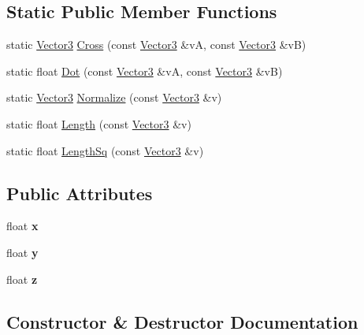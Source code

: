 \subsection*{Static Public Member Functions}
\begin{DoxyCompactItemize}
\item 
static \hyperlink{class_vector3}{Vector3} \hyperlink{class_vector3_a9f00ed675f4ba9628c82215fa23ab885}{Cross} (const \hyperlink{class_vector3}{Vector3} \&v\+A, const \hyperlink{class_vector3}{Vector3} \&v\+B)
\item 
static float \hyperlink{class_vector3_ae785bd82122c8762428f2fad2cb56322}{Dot} (const \hyperlink{class_vector3}{Vector3} \&v\+A, const \hyperlink{class_vector3}{Vector3} \&v\+B)
\item 
static \hyperlink{class_vector3}{Vector3} \hyperlink{class_vector3_a4553a772b237e9cfde34221085c45f6e}{Normalize} (const \hyperlink{class_vector3}{Vector3} \&v)
\item 
static float \hyperlink{class_vector3_a18ef0d3d62a924270b424d3d13d9d8a5}{Length} (const \hyperlink{class_vector3}{Vector3} \&v)
\item 
static float \hyperlink{class_vector3_a3362389fbc70c95d55099925fa859866}{Length\+Sq} (const \hyperlink{class_vector3}{Vector3} \&v)
\end{DoxyCompactItemize}
\subsection*{Public Attributes}
\begin{DoxyCompactItemize}
\item 
\hypertarget{class_vector3_a7e2d3237b29a2f29d7b3d8b2934e35f2}{}float {\bfseries x}\label{class_vector3_a7e2d3237b29a2f29d7b3d8b2934e35f2}

\item 
\hypertarget{class_vector3_a86eb35a9fa2d5a49e7fad66a35fa9c13}{}float {\bfseries y}\label{class_vector3_a86eb35a9fa2d5a49e7fad66a35fa9c13}

\item 
\hypertarget{class_vector3_aa8c9461eb24bd2c364258078811a3e9d}{}float {\bfseries z}\label{class_vector3_aa8c9461eb24bd2c364258078811a3e9d}

\end{DoxyCompactItemize}


\subsection{Constructor \& Destructor Documentation}
\hypertarget{class_vector3_a0f49191f7e001e7f7ae1cb49522118b4}{}
